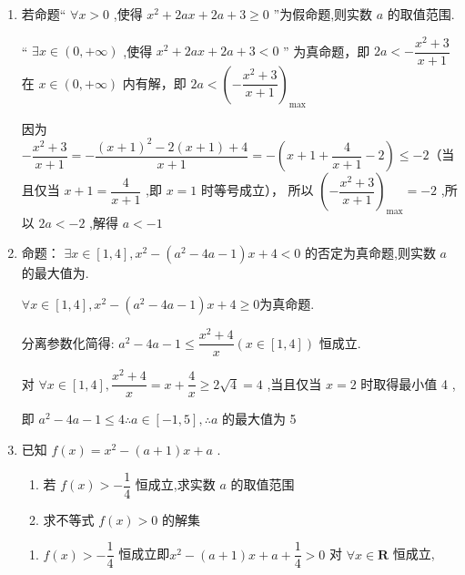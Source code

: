 \begin{enumerate}
\begin{jieda}
        构造函数 $g\left( t\right)  = \dfrac{1}{4}\left( {t + \dfrac{9}{t} + 2}\right)  \geq  \dfrac{1}{4}\left( {2\sqrt{t \cdot  \dfrac{9}{t}} + 2}\right)  = 2$ ,
        
        即 $g{\left( t\right) }_{\min } = 2$ ,当且仅当 $t = 3 \in  \left\lbrack  {1,5}\right\rbrack$ 时取等号，所以 $a \geq  g{\left( t\right) }_{\min } = 2$
    \end{jieda} 
    \item 若命题“ $\forall x > 0$ ,使得 ${x^2} + {2ax} + {2a} + 3 \geq  0$ ”为假命题,则实数 $a$ 的取值范围.
    \begin{jieda}
         “ $\exists x \in  \left( {0, + \infty }\right)$ ,使得 $x^{2} + {2a}x + {2a} + 3 < 0$ ” 为真命题，即 ${2a} <  - \dfrac{x^{2} + 3}{x + 1}$ 在 $x \in  \left( {0, + \infty }\right)$ 内有解，即 ${2a} < {\left( -\dfrac{x^{2} + 3}{x + 1}\right) }_{\max }$
         
        因为 $- \dfrac{x^{2} + 3}{x + 1} =  - \dfrac{{\left( x + 1\right) }^{2} - 2\left( {x + 1}\right)  + 4}{x + 1} =  - \left( {x + 1 + \dfrac{4}{x + 1} - 2}\right) \leq - 2$（当且仅当 $x + 1 = \dfrac{4}{x + 1}$ ,即 $x = 1$ 时等号成立），
        所以 ${\left( -\dfrac{x^{2} + 3}{x + 1}\right) }_{\max } =  - 2$ ,所以 ${2a} <  - 2$ ,解得 $a <  - 1$
    \end{jieda}
    \item 命题： $\exists x \in  \left\lbrack  {1,4}\right\rbrack  ,{x^2} - \left( {{a^2} - {4a} - 1}\right) x + 4 < 0$ 的否定为真命题,则实数 $a$ 的最大值为.
    \begin{jieda}
        $\forall x \in  \left\lbrack  {1,4}\right\rbrack  ,{x^2} - \left( {{a^2} - {4a} - 1}\right) x + 4 \geq  0$为真命题.
                
        分离参数化简得: ${a^2} - {4a} - 1 \leq  \dfrac{{x}^{2} + 4}{x}\left( {x \in  \left\lbrack  {1,4}\right\rbrack  }\right)$ 恒成立.
        
        对 $\forall x \in  \left\lbrack  {1,4}\right\rbrack  ,\dfrac{{x^2} + 4}{x} = x + \dfrac{4}{x} \geq  2\sqrt{4} = 4$ ,当且仅当 $x = 2$ 时取得最小值 4 ,
        
        即 ${a^2} - {4a} - 1 \leq  4\therefore a \in  \left\lbrack  {-1,5}\right\rbrack  ,\therefore a$ 的最大值为 5
    \end{jieda}
    \item  已知 $f\left( x\right)  = {x}^{2} - \left( {a + 1}\right) x + a$ . 
    \begin{enumerate}
        \item 若 $f\left( x\right)  >  - \dfrac{1}{4}$ 恒成立,求实数 $a$ 的取值范围
        \item 求不等式 $f\left( x\right)  > 0$ 的解集
    \end{enumerate}
    \begin{jieda}
        \begin{enumerate}
            \item $f\left( x\right)  >  - \dfrac{1}{4}$ 恒成立即${x}^{2} - \left( {a + 1}\right) x + a + \dfrac{1}{4} > 0$ 对 $\forall x \in  \mathbf{R}$ 恒成立,
            

\end{enumerate}
\end{jieda}
\end{enumerate}
